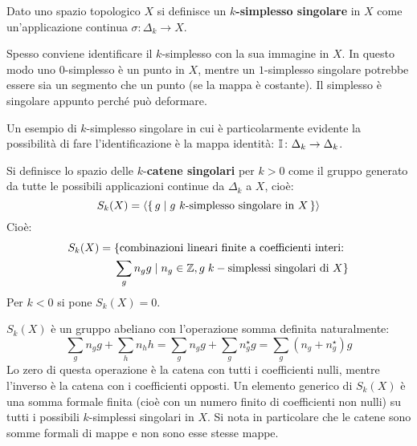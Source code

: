 \begin{definition}
  Dato uno spazio topologico $ X $ si definisce un \textbf{$ k $-simplesso singolare}
  in $ X $ come un'applicazione continua $ \sigma: \Delta_k \to X $.
\end{definition}
Spesso conviene identificare il $ k $-simplesso con la sua immagine in $ X $. In
questo modo uno $ 0 $-simplesso è un punto in $ X $, mentre un $ 1 $-simplesso
singolare potrebbe essere sia un segmento che un punto (se la mappa è costante).
Il simplesso è singolare appunto perché può deformare.

\begin{example}
  Un esempio di $ k $-simplesso singolare in cui è particolarmente evidente la possibilità di fare l'identificazione
  è la mappa identità: $ \mathbb{I}_{} \colon \Delta_k \to \Delta_k $.
\end{example}


\begin{definition}
  Si definisce lo spazio delle $ k $-\textbf{catene
    singolari} per $ k > 0 $ come il gruppo generato da tutte le
  possibili applicazioni continue da $ \Delta_k $ a $ X $, cioè:
  \[
    S_k(X) = \langle \set{g | g \text{ $ k $-simplesso singolare in $ X $}} \rangle
  \]
  Cioè:
  \begin{align*}
  S_k(X) ={}& \{\text{combinazioni lineari finite a coefficienti interi: } \\
            & \sum_g n_g g \;|\; n_g \in \mathbb{Z}, g \; k-\text{simplessi singolari di } X \}
  \end{align*}
  Per $ k < 0 $ si pone $ S_k(X) = 0 $.
\end{definition}
$ S_k(X) $ è un gruppo abeliano con l'operazione somma definita naturalmente:
\[
  \sum_g n_g g + \sum_h n_h h =   \sum_g n_g g + \sum_g n_g^\star g = \sum_g (n_g + n_g^\star)g
\]
Lo zero di questa operazione è la catena con tutti i coefficienti nulli, mentre
l'inverso è la catena con i coefficienti opposti. Un elemento generico di
$ S_k(X) $ è una somma formale finita (cioè con un numero finito di coefficienti
non nulli) su tutti i possibili $ k $-simplessi singolari in $ X $. Si nota in
particolare che le catene sono somme formali di mappe e non sono esse stesse
mappe.

